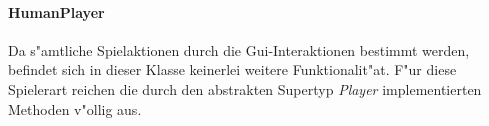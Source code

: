 \paragraph{HumanPlayer}
\label{par:humanPlayer}
Da s"amtliche Spielaktionen durch die Gui-Interaktionen bestimmt werden, befindet sich in dieser Klasse keinerlei weitere Funktionalit"at. F"ur diese Spielerart reichen die durch den abstrakten Supertyp \emph{Player} implementierten Methoden v"ollig aus. 